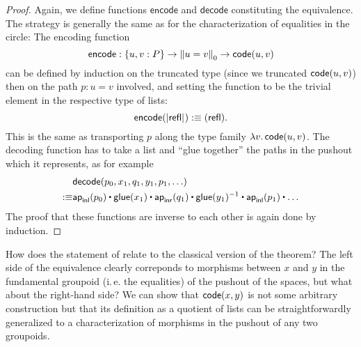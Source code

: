 \begin{proof}
Again, we define functions $\mathsf{encode}$ and $\mathsf{decode}$ constituting
the equivalence.
The strategy is generally the same as for the characterization of equalities
in the circle:
The encoding function
\begin{equation*}
\mathsf{encode} : \{u, v : P\} \to \trunc{0}{u = v} \to \code(u, v)
\end{equation*}
can be defined by induction on the truncated type (since we truncated $\code(u,v)$)
then on the path $p : u = v$ involved, and setting the function to be the trivial
element in the respective type of lists:
\begin{equation*}
\mathsf{encode}(\tproj{}{\refl}) :\equiv (\refl) \text{.}
\end{equation*}
This is the same as transporting $p$ along the type family $\lambda v.\, \code(u,v)$.
The decoding function has to take a list and ``glue together'' the paths in the
pushout which it represents, as for example
\begin{align*}
 & \mathsf{decode} (p_0, x_1, q_1, y_1, p_1, \ldots) \\
:\equiv & \ap_\inl(p_0) \ct \glue(x_1) \ct \ap_\inr(q_1) \ct \glue(y_1)\inv \ct \ap_\inl(p_1) \ct \ldots
\end{align*}
The proof that these functions are inverse to each other is again done by induction.
\end{proof}

\begin{remark}
How does the statement of  relate to the classical
version of the theorem?
The left side of the equivalence clearly correponds to morphisms between
$x$ and $y$ in the fundamental groupoid (i.\,e. the equalities) of the pushout
of the spaces, but what about the right-hand side?
We can show that $\code(x,y)$ is not some arbitrary construction but that
its definition as a quotient of lists can be straightforwardly generalized
to a characterization of morphisms in the pushout of any two groupoids.
\end{remark}








